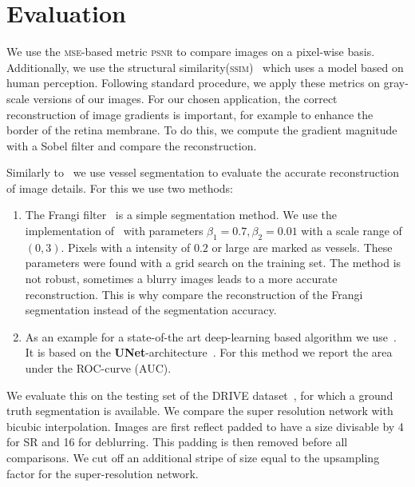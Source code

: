 \documentclass{scrartcl}
\begin{document}
\section{Evaluation}
We use the \textsc{mse}-based metric \textsc{psnr} to compare images on a pixel-wise basis.
Additionally, we use the structural similarity(\textsc{ssim})~\cite{Ssim} which uses a model based on human perception.
Following standard procedure, we apply these metrics on gray-scale versions of our images.
For our chosen application, the correct reconstruction of image gradients is important, for example to enhance the border of the retina membrane.
To do this, we compute the gradient magnitude with a Sobel filter and compare the reconstruction.

Similarly to~\cite{SaliencyGAN} we use vessel segmentation to evaluate the accurate reconstruction of image details.
For this we use two methods:
\begin{enumerate}
  \item The Frangi filter~\cite{Frangi} is a simple segmentation method.
  We use the implementation of~\cite{Scikit-image} with parameters $\beta_1 = 0.7, \beta_2=0.01$ with a scale range of $(0, 3)$.
  Pixels with a intensity of $0.2$ or large are marked as vessels.
  These parameters were found with a grid search on the training set.
  The method is not robust, sometimes a blurry images leads to a more accurate reconstruction.
  This is why compare the reconstruction of the Frangi segmentation instead of the segmentation accuracy.
\item As an example for a state-of-the art deep-learning based algorithm we use~\cite{RetinaUnet}.
  It is based on the \textbf{UNet}-architecture~\cite{Unet}.
  For this method we report the area under the \textsc{ROC}-curve (\textsc{AUC}).
\end{enumerate}
We evaluate this on the testing set of the DRIVE dataset~\cite{Drive}, for which a ground truth segmentation is available.
We compare the super resolution network with bicubic interpolation.
Images are first reflect padded to have a size divisable by 4 for SR and 16 for deblurring.
This padding is then removed before all comparisons.
We cut off an additional stripe of size equal to the upsampling factor for the super-resolution network.
\end{document}
